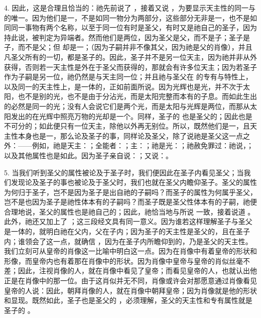 4. 因此，这是合理且恰当的：祂先前说了 ，接着又说 ，为要显示天主性的同一与  的唯一。因为他们是一，不是如同一物分为两部分，这些部分无非是一，也不是如同同一事物有两个名称，以至于同一位有时是圣父，有时又是祂自己的圣子，因为  持此说，被判定为异端者。然而他们是两位，因为圣父是父，而不是子；圣子是子，而不是父；但  却是一；（因为子嗣并非不像其父，因为祂是父的肖像），并且凡圣父所有的一切，都是圣子的。因此，圣子并不是另一位天主，因为祂并非从外获得，否则若一天主性是外在于圣父而获得的，那就会有许多位天主；因为若圣子作为子嗣是另一位，祂仍然是与天主同一位；并且祂与圣父在  的专有与特性上，以及同一的天主性上，是一体的，正如前面所说。因为光辉也是光，并不次于太阳，也不是别的光，也不是由于分沾光，而是太阳完整而本有的子息。而如此生出的必然是同一的光；没有人会说它们是两个光，而是太阳与光辉是两位，而那从太阳发出的在光辉中照亮万物的光却是一个。同样，圣子的  也是圣父的；因此也是不可分的；如此便只有一位天主，除他以外再无别位。所以，既然他们是一，且天主性本身也是一，那么论及圣子的事，同样论及圣父，除了说祂是圣父这一点之外：——例如，祂是天主：；全能者：；主：；祂是光：；祂赦免罪过：祂说，；以及其他属性也是如此。因为圣子亲自说：；又说：。\par

5. 当我们听到圣父的属性被论及于圣子时，我们便因此在圣子内看见圣父；当我们发现论及圣子的事也被论及于圣父时，我们也就在圣父内瞻仰圣子。圣父的属性为何归于圣子，岂不是因为圣子是出自祂的子嗣吗？而圣子的属性为何属乎圣父，岂不是也因为圣子是祂性体本有的子嗣吗？而圣子既是圣父性体本有的子嗣，祂便合理地说，圣父的属性也是祂自己的；因此，祂恰当地与所说  一致，接着说道 。此外，祂还又加上了 ；这三段经文具有同一意义。因为谁若这样理解圣子与圣父是一体的，就明白祂在父内，父在子内；因为圣子的天主性是圣父的，且在圣子内；谁领会了这一点，就确信 ，因为在圣子内所瞻仰到的，乃是圣父的天主性。我们立刻可从皇帝的肖像这一比喻中明白这一点。因为在肖像中有着皇帝的形状和形像，而皇帝内也有着那在肖像中的形状。因为肖像中皇帝与皇帝的肖似丝毫不差；因此，注视肖像的人，就在肖像中看见了皇帝；而看见皇帝的人，也就认出他正是在肖像中的那一位。由于这肖似并无不同，肖像或许会对那愿意通过肖像看见皇帝的人说：因此，朝拜肖像的人，就在肖像中朝拜皇帝；因为肖像就是他的形状和显现。既然如此，圣子也是圣父的 ，必须理解，圣父的天主性和专有属性就是圣子的 。\par

